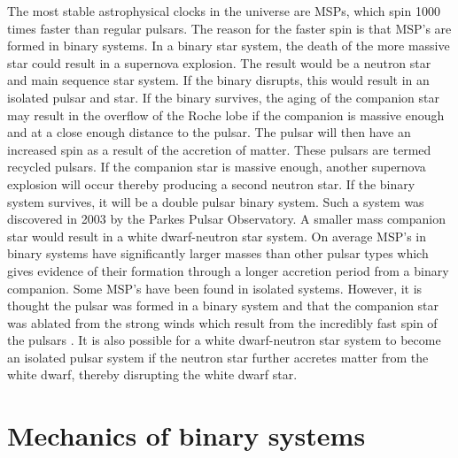 \documentclass[12pt]{article}
\begin{document}
	
	
	
	
	
	\noindent The most stable astrophysical clocks in the universe are MSPs, which spin 1000 times faster than regular pulsars. The reason for the faster spin is that MSP's are formed in binary systems. In a binary star system, the death of the more massive star could result in a supernova explosion. The result would be a neutron star and main sequence star system. If the binary disrupts, this would result in an isolated pulsar and star. If the binary survives, the aging of the companion star may result in the overflow of the Roche lobe if the companion is massive enough and at a close enough distance to the pulsar. The pulsar will then have an increased spin as a result of the accretion of matter. These pulsars are termed recycled pulsars. If the companion star is massive enough, another supernova explosion will occur thereby producing a second neutron star. If the binary system survives, it will be a double pulsar binary system. Such a system was discovered in 2003 by the Parkes Pulsar Observatory. A smaller mass companion star would result in a white dwarf-neutron star system. On average MSP's in binary systems have significantly larger masses than other pulsar types which gives evidence of their formation through a longer accretion period from a binary companion. Some MSP's have been found in isolated systems. However, it is thought the pulsar was formed in a binary system and that the companion star was ablated from the strong winds which result from the incredibly fast spin of the pulsars \cite{kluzniak1988nature}. It is also possible for a white dwarf-neutron star system to become an isolated pulsar system if the neutron star further accretes matter from the white dwarf, thereby disrupting the white dwarf star. 
	
	\section{Mechanics of binary systems}
	\label{sec:Mechanics of binary systems}
	
\end{document}
